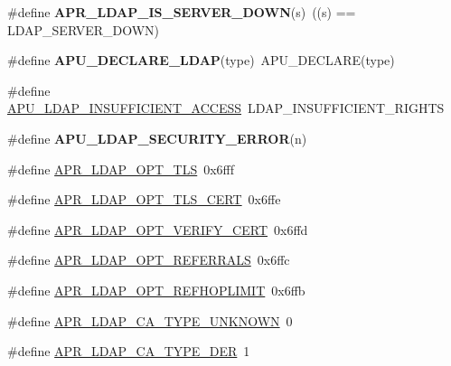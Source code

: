\begin{DoxyCompactItemize}
\item 
\hypertarget{group___a_p_r___util___l_d_a_p_ga211cc964400070e9dbe805f91ff4a321}{\#define {\bfseries A\-P\-R\-\_\-\-L\-D\-A\-P\-\_\-\-I\-S\-\_\-\-S\-E\-R\-V\-E\-R\-\_\-\-D\-O\-W\-N}(s)~((s) == L\-D\-A\-P\-\_\-\-S\-E\-R\-V\-E\-R\-\_\-\-D\-O\-W\-N)}\label{group___a_p_r___util___l_d_a_p_ga211cc964400070e9dbe805f91ff4a321}

\item 
\hypertarget{group___a_p_r___util___l_d_a_p_ga13ada0d5580b69e66018e53a773ee355}{\#define {\bfseries A\-P\-U\-\_\-\-D\-E\-C\-L\-A\-R\-E\-\_\-\-L\-D\-A\-P}(type)~A\-P\-U\-\_\-\-D\-E\-C\-L\-A\-R\-E(type)}\label{group___a_p_r___util___l_d_a_p_ga13ada0d5580b69e66018e53a773ee355}

\item 
\#define \hyperlink{group___a_p_r___util___l_d_a_p_ga381609c46f026364996ee2bc88ccbc68}{A\-P\-U\-\_\-\-L\-D\-A\-P\-\_\-\-I\-N\-S\-U\-F\-F\-I\-C\-I\-E\-N\-T\-\_\-\-A\-C\-C\-E\-S\-S}~L\-D\-A\-P\-\_\-\-I\-N\-S\-U\-F\-F\-I\-C\-I\-E\-N\-T\-\_\-\-R\-I\-G\-H\-T\-S
\item 
\#define {\bfseries A\-P\-U\-\_\-\-L\-D\-A\-P\-\_\-\-S\-E\-C\-U\-R\-I\-T\-Y\-\_\-\-E\-R\-R\-O\-R}(n)
\item 
\#define \hyperlink{group___a_p_r___util___l_d_a_p_gae3eda4797aebb6dadeb5876c0f7f4b0b}{A\-P\-R\-\_\-\-L\-D\-A\-P\-\_\-\-O\-P\-T\-\_\-\-T\-L\-S}~0x6fff
\item 
\#define \hyperlink{group___a_p_r___util___l_d_a_p_gaa36993968e0225cb175eb17039337433}{A\-P\-R\-\_\-\-L\-D\-A\-P\-\_\-\-O\-P\-T\-\_\-\-T\-L\-S\-\_\-\-C\-E\-R\-T}~0x6ffe
\item 
\#define \hyperlink{group___a_p_r___util___l_d_a_p_ga30949c4b417283ea02049267a5b7b1b1}{A\-P\-R\-\_\-\-L\-D\-A\-P\-\_\-\-O\-P\-T\-\_\-\-V\-E\-R\-I\-F\-Y\-\_\-\-C\-E\-R\-T}~0x6ffd
\item 
\#define \hyperlink{group___a_p_r___util___l_d_a_p_gaaa1fbd408f4d18c39ef5332f8d0f4745}{A\-P\-R\-\_\-\-L\-D\-A\-P\-\_\-\-O\-P\-T\-\_\-\-R\-E\-F\-E\-R\-R\-A\-L\-S}~0x6ffc
\item 
\#define \hyperlink{group___a_p_r___util___l_d_a_p_ga3dcf151b8758dae4ccf86d1cf26f4bfc}{A\-P\-R\-\_\-\-L\-D\-A\-P\-\_\-\-O\-P\-T\-\_\-\-R\-E\-F\-H\-O\-P\-L\-I\-M\-I\-T}~0x6ffb
\item 
\#define \hyperlink{group___a_p_r___util___l_d_a_p_ga90551ccd55675410d148e1396d708585}{A\-P\-R\-\_\-\-L\-D\-A\-P\-\_\-\-C\-A\-\_\-\-T\-Y\-P\-E\-\_\-\-U\-N\-K\-N\-O\-W\-N}~0
\item 
\#define \hyperlink{group___a_p_r___util___l_d_a_p_gab5336a116c3881aa68ea5fe81c6cebce}{A\-P\-R\-\_\-\-L\-D\-A\-P\-\_\-\-C\-A\-\_\-\-T\-Y\-P\-E\-\_\-\-D\-E\-R}~1

\end{DoxyCompactItemize}
